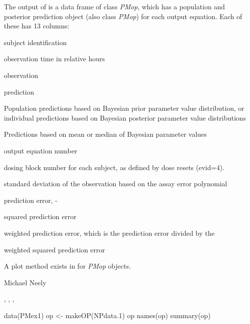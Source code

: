 \documentclass[a4paper]{book}
\begin{document}
\begin{Value}
The output of  is a data frame of class \emph{PMop}, which has a population and posterior
prediction object (also class \emph{PMop}) for each output equation.  Each of these has 13 columns:
\begin{ldescription}
\item[\code{id }] subject identification
\item[\code{time }] observation time in relative hours
\item[\code{obs }] observation
\item[\code{pred }] prediction
\item[\code{pred.type }] Population predictions based on Bayesian prior parameter value distribution,
or individual predictions based on Bayesian posterior parameter value distributions
\item[\code{icen }] Predictions based on mean or median of Bayesian  parameter values
\item[\code{outeq }] output equation number
\item[\code{block }] dosing block number for each subject, as defined by dose resets (evid=4).
\item[\code{obsSD }] standard deviation of the observation based on the assay error polynomial
\item[\code{d }] prediction error, -
\item[\code{ds }] squared prediction error
\item[\code{wd }] weighted prediction error, which is the prediction error divided by the 
\item[\code{wds }] weighted squared prediction error
\end{ldescription}
A plot method exists in  for \emph{PMop} objects.
\end{Value}
%
\begin{Author}\relax
Michael Neely
\end{Author}
%
\begin{SeeAlso}\relax
{}, , , 
\end{SeeAlso}
%
\begin{Examples}
\begin{ExampleCode}
data(PMex1)
op <- makeOP(NPdata.1)
op
names(op)
summary(op)
\end{ExampleCode}
\end{Examples}
\end{document}
